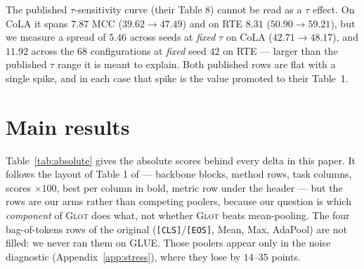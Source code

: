 \documentclass{article}
\begin{document}
The published $\tau$-sensitivity curve (their Table 8) cannot be read as a
$\tau$ effect. On CoLA it spans $7.87$ MCC ($39.62 \rightarrow 47.49$) and on
RTE $8.31$ ($50.90 \rightarrow 59.21$), but we measure a spread of $5.46$ across
seeds at \emph{fixed} $\tau$ on CoLA ($42.71 \rightarrow 48.17$), and $11.92$
across the $68$ configurations at \emph{fixed} seed $42$ on RTE --- larger than
the published $\tau$ range it is meant to explain. Both published rows are flat
with a single spike, and in each case that spike is the value promoted to their
Table~1.

\section{Main results}
\label{app:results}

Table~\ref{tab:absolute} gives the absolute scores behind every delta in this
paper. It follows the layout of Table 1 of \citet{mantri2026glot} --- backbone
blocks, method rows, task columns, scores $\times100$, best per column in bold,
metric row under the header --- but the rows are our arms rather than competing
poolers, because our question is which \emph{component} of \textsc{Glot} does
what, not whether \textsc{Glot} beats mean-pooling. The four bag-of-tokens rows
of the original (\texttt{[CLS]}/\texttt{[EOS]}, Mean, Max, AdaPool) are not
filled: we never ran them on GLUE. Those poolers appear only in the noise
diagnostic (Appendix~\ref{app:stress}), where they lose by $14$--$35$ points.
\end{document}

